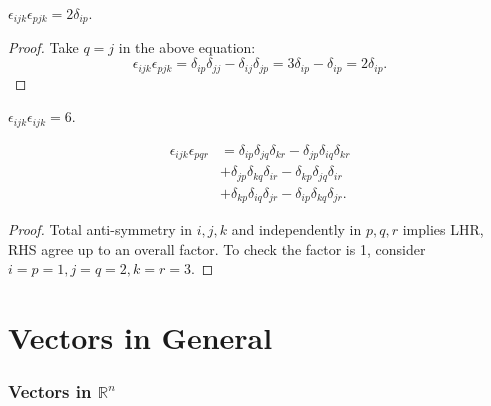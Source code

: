 \documentclass[10pt]{article}
\begin{document}
    \begin{proposition}\label{prop:eeidentity2}
        $ \epsilon_{ijk}\epsilon_{pjk}=2\delta_{ip}. $
    \end{proposition}
    \begin{proof}
        Take $q=j$ in the above equation:
        \[
            \epsilon_{ijk}\epsilon_{pjk}=\delta_{ip}\delta_{jj}-\delta_{ij}\delta_{jp}=3\delta_{ip}-\delta_{ip}=2\delta_{ip}
        .\]
    \end{proof}
    \begin{proposition}\label{prop:eeidentity3}
        $  \epsilon_{ijk}\epsilon_{ijk}=6 $.
    \end{proposition}
    \begin{proposition}\label{prop:eeidentity4}
        \[
            \begin{aligned}
                \epsilon_{ijk}\epsilon_{pqr}&=\delta_{ip}\delta_{jq}\delta_{kr}-\delta_{jp}\delta_{iq}\delta_{kr}\\
                &+\delta_{jp}\delta_{kq}\delta_{ir}-\delta_{kp}\delta_{jq}\delta_{ir}\\
                &+\delta_{kp}\delta_{iq}\delta_{jr}-\delta_{ip}\delta_{kq}\delta_{jr}.
            \end{aligned}
        \]
    \end{proposition}
    \begin{proof}
        Total anti-symmetry in $i,j,k$ and independently in $p,q,r$ implies LHR, RHS agree up to an overall factor. To check the factor is 1, consider $i=p=1, j=q=2, k=r=3$.
    \end{proof}
    \part{Vectors in General}
    \section{Vectors in $ \mathbb{R}^n $}
\end{document}
